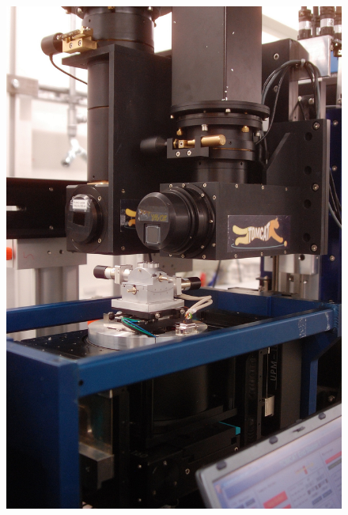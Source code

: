 \begin{figure}
{{			\includegraphics[width=\imsize]{img/TOMCAT2}%
			\label{subfig:TOMCAT2}%
		}%
		\subfloat[Sample]{%
}}
\end{figure}
